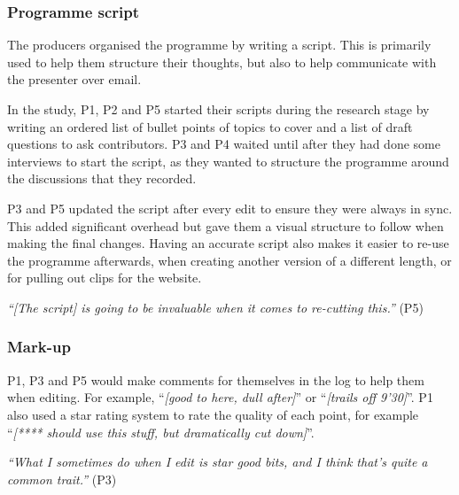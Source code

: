 \subsubsection{Programme script}
The producers organised the programme by writing a script. This is primarily used to help them structure their
thoughts, but also to help communicate with the presenter over email.

In the study, P1, P2 and P5 started their scripts during the research stage by writing an ordered list of bullet points
of topics to cover and a list of draft questions to ask contributors.  P3 and P4 waited until after they had done some
interviews to start the script, as they wanted to structure the programme around the discussions that they recorded.

P3 and P5 updated the script after every edit to ensure they were always in sync. This added significant overhead but
gave them a visual structure to follow when making the final changes.
Having an accurate script also makes it easier to re-use the programme afterwards, when creating another version of a
different length, or for pulling out clips for the website.

\textit{``[The script] is going to be invaluable when it comes to re-cutting this.''} (P5)

\subsubsection{Mark-up}

P1, P3 and P5 would make comments for themselves in the log to help them when
editing. For example, ``\textit{[good to here, dull after]}'' or
``\textit{[trails off 9'30]}''. P1 also used a star rating system to rate the
quality of each point, for example ``\textit{[**** should use this stuff, but
  dramatically cut down]}''.

\textit{``What I sometimes do when I edit is star good bits, and I think
  that's quite a common trait.''} (P3)

